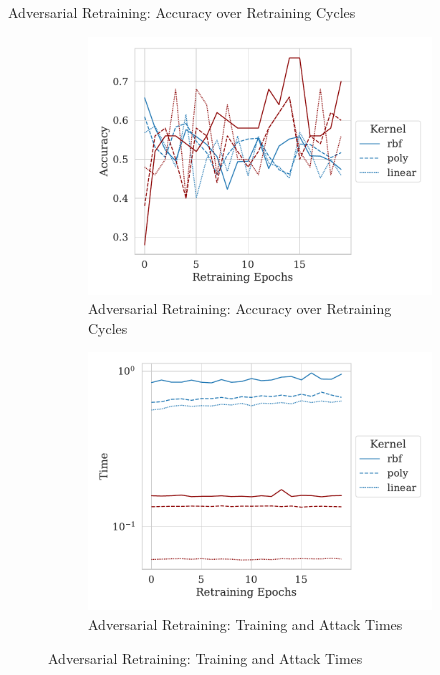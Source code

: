 \documentclass{beamer}
\begin{document}
\begin{frame}{Adversarial Retraining: Accuracy over Retraining Cycles}
  \begin{figure}
    \centering
    \begin{subfigure}[b]{0.45\textwidth}
      \centering
      \includegraphics[width=\textwidth]{./generated/retrain_accuracy.pdf}
      \caption{Adversarial Retraining: Accuracy over Retraining Cycles}
    \end{subfigure}
    \centering
    \begin{subfigure}[b]{0.45\textwidth}
      \centering
      \includegraphics[width=\textwidth]{./generated/retrain_time.pdf}
      \caption{Adversarial Retraining: Training and Attack Times}
    \end{subfigure}
  \end{figure}
\end{frame}
\end{document}

